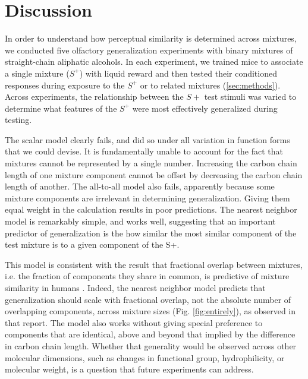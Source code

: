 \section*{Discussion}
\label{sec:discussion}
In order to understand how perceptual similarity is determined across mixtures, we conducted five olfactory generalization experiments with binary mixtures of straight-chain aliphatic alcohols.  
In each experiment, we trained mice to associate a single mixture ($S^+$) with liquid reward and then tested their conditioned responses during exposure to the $S^+$ or to related mixtures (\ref{sec:methods}).  
Across experiments, the relationship between the $S+$ test stimuli was varied to determine what features of the $S^+$ were most effectively generalized during testing.  

The scalar model clearly fails, and did so under all variation in function forms that we could devise.  It is fundamentally unable to account for the fact that mixtures cannot be represented by a single number.  Increasing the carbon chain length of one mixture component cannot be offset by decreasing the carbon chain length of another.  The all-to-all model also fails, apparently because some mixture components are irrelevant in determining generalization.  Giving them equal weight in the calculation results in poor predictions.  The nearest neighbor model is remarkably simple, and works well, suggesting that an important predictor of generalization is the how similar the most similar component of the test mixture is to a given component of the S+.  

This model is consistent with the result that fractional overlap between mixtures, i.e. the fraction of components they share in common, is predictive of mixture similarity in humans \cite{24653035}.  Indeed, the nearest neighbor model predicts that generalization should scale with fractional overlap, not the absolute number of overlapping components, across mixture sizes (Fig. \ref{fig:entirely}), as observed in that report.  The model also works without giving special preference to components that are identical, above and beyond that implied by the difference in carbon chain length.  Whether that generality would be observed across other molecular dimensions, such as changes in functional group, hydrophilicity, or molecular weight, is a question that future experiments can address.  

